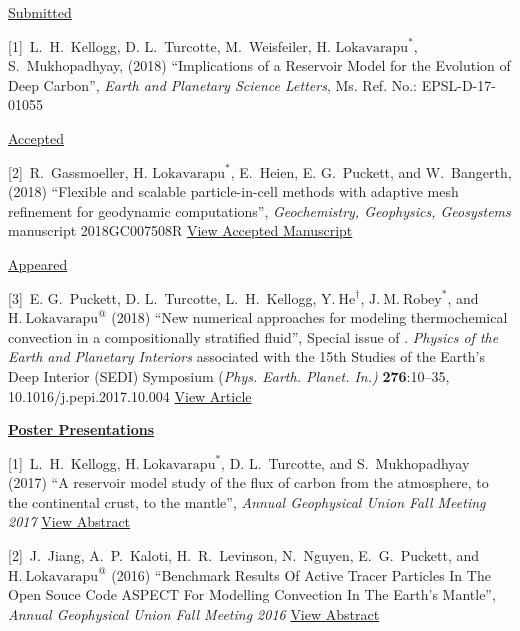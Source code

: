 \documentclass[11pt]{ltxdoc}
\begin{document}

\noindent
\underline{Submitted}

\hangindent 20pt
[1]~L.~H.~Kellogg, D. L.~Turcotte, M.~Weisfeiler, $\textrm{H.~Lokavarapu}^*$, S.~Mukhopadhyay, (2018) 
``Implications of a Reservoir Model for the
Evolution of Deep Carbon'', 
\textit{Earth and Planetary Science Letters}, Ms. Ref. No.:  EPSL-D-17-01055

\noindent
\underline{Accepted}

\hangindent 20pt
[2]~R.~Gassmoeller,  $\textrm{H.~Lokavarapu}^*$, E.~Heien, E. G.~Puckett, and W.~Bangerth, (2018) 
``Flexible and scalable particle-in-cell methods with adaptive mesh refinement for geodynamic computations'', 
\textit{Geochemistry, Geophysics, Geosystems} manuscript 2018GC007508R 
\href{https://www.math.ucdavis.edu/~egp/PUBLICATIONS/JOURNAL_ARTICLES/ACCEPTED/RG-HL-EH-EGP-WB-2018.pdf}{View Accepted Manuscript}

\noindent
\underline{Appeared}

\vskip 06pt

\hangindent 20pt
[3]~E. G.~Puckett, D. L.~Turcotte, L.~H.~Kellogg,  $\mathrm{Y.~He}^{\dagger}$, $\mathrm{J.~M.~Robey}^{*}$, and 
$\mathrm{H.~Lokavarapu}^{@}$ (2018)
``New numerical approaches for modeling thermochemical convection in a compositionally stratified fluid'', 
Special issue of . \textit{Physics of the Earth and Planetary Interiors} associated with the 15th Studies of the Earth's Deep Interior (SEDI) Symposium (\textit{Phys. Earth. Planet. In.)} \textbf{276}:10–35, 10.1016/j.pepi.2017.10.004
\href{https://www.math.ucdavis.edu/~egp/PUBLICATIONS/JOURNAL_ARTICLES/APPEARED/2018/EGP-DLT-YH-HL-JMR-LHK-2018.pdf}{View Article}

\noindent
\textbf{\underline{Poster Presentations}}


\hangindent 20pt
[1]~L.~H.~Kellogg, $\mathrm{H.~Lokavarapu}^{*}$, D. L.~Turcotte, and S.~Mukhopadhyay (2017) 
``A reservoir model study of the flux of carbon from the atmosphere, to the continental crust, to the mantle'', 
\textit{Annual Geophysical Union Fall Meeting 2017}
\href{http://adsabs.harvard.edu/abs/2017AGUFMDI14A..06K}{View Abstract}

\hangindent 20pt
[2]~J.~Jiang, A.~P.~Kaloti, H.~R.~Levinson, N.~Nguyen, E.~G.~Puckett, and $\mathrm{H.~Lokavarapu}^{@}$ (2016) 
``Benchmark Results Of Active Tracer Particles In The Open Souce Code ASPECT For Modelling Convection In The Earth's Mantle'', 
\textit{Annual Geophysical Union Fall Meeting 2016}
\href{http://adsabs.harvard.edu/abs/2016AGUFM.T23C2946J}{View Abstract}
\end{document}
